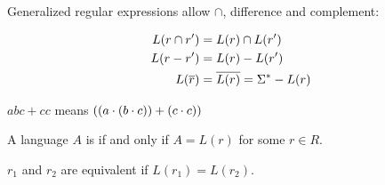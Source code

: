 \documentclass[11pt, cyan, night, 0.5in]{hw}
\begin{document}
Generalized regular expressions allow $\cap$, difference and complement:

\begin{align*}
    L(r\cap r') &= L(r)\cap L(r')\\
    L(r-r') &= L(r) - L(r')\\
    L(\overline{r}) &= \overline{L(r)} = \Sigma^* - L(r)
\end{align*}

$abc+cc$ means $((a\cdot (b\cdot c)) + (c\cdot c))$

A language $A$ is \underline{} if and only if $A=L(r)$ for some $r\in R$.

$r_1$ and $r_2$ are equivalent if $L(r_1)=L(r_2)$.

\end{document}
